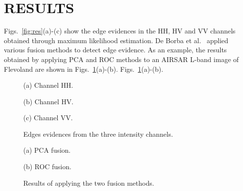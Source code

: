 \documentclass{article}
\begin{document}
\section{RESULTS}
\vspace{-0.2cm}
Figs.~\ref{fig:res}(a)-(c) show the edge evidences in the HH, HV and VV channels obtained through maximum likelihood estimation.
De Borba et al.~\cite{DeBorba2020} applied various fusion methods to detect edge evidence. 
As an example, the results obtained by applying PCA and ROC methods to an AIRSAR L-band image of Flevoland are shown in Figs.~\ref{fig:2}(a)-(b).
Figs.~\ref{fig:2}(a)-(b).
\begin{figure}[htb]
    \begin{minipage}{0.6\textwidth}
       \begin{minipage}[b]{.32\linewidth}
  \centering
 \centerline{}
  \vspace{-0.1cm}
  \centerline{(a) Channel HH.}\medskip
\end{minipage}
\begin{minipage}[b]{.32\linewidth}
  \centering
\centerline{}
  \vspace{-0.1cm}
  \centerline{(b) Channel HV.}\medskip
\end{minipage}
\begin{minipage}[b]{0.31\linewidth}
  \centering
 \centerline{}
  \vspace{-0.1cm}
  \centerline{(c) Channel VV.}\medskip
\end{minipage}\vspace{-0.3cm}
       \caption{Edges evidences from the three intensity channels.}
\label{fig:res}
    \end{minipage}%
    \begin{minipage}{0.4\textwidth}
        \centering
       \begin{minipage}[b]{.49\linewidth}
  \centering
\centerline{}
  \vspace{-0.1cm}
  \centerline{(a) PCA fusion.}\medskip
\end{minipage}
\hfill
\begin{minipage}[b]{0.49\linewidth}
  \centering
 \centerline{}
  \vspace{-0.1cm}
  \centerline{(b) ROC fusion.}\medskip
\end{minipage}\vspace{-0.3cm}
        \caption{Results of applying the two fusion methods.}
\label{fig:2}
    \end{minipage}
\end{figure}
\end{document}
